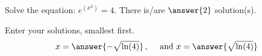 \documentclass{ximera}
\begin{document}
\begin{exercise}
	Solve the equation:  $e^{(x^2)} = 4$.
	There is/are $\answer{2}$ solution(s).
	\begin{exercise}
		Enter your solutions, smallest first.  
		\[ x = \answer{-\sqrt{\ln(4)}} \, , \quad \text{ and } x = \answer{\sqrt{\ln(4)}} \]
	\end{exercise}

\end{exercise}
\end{document}
